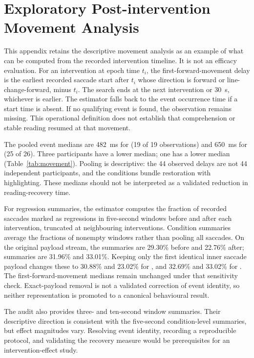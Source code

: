 \section{Exploratory Post-intervention Movement Analysis}
\label{sec:exploratory}

This appendix retains the descriptive movement analysis as an example of what can be computed from the recorded intervention timeline. It is not an efficacy evaluation. For an intervention at epoch time $t_i$, the first-forward-movement delay is the earliest recorded saccade start after $t_i$ whose direction is forward or line-change-forward, minus $t_i$. The search ends at the next intervention or 30~s, whichever is earlier. The estimator falls back to the event occurrence time if a start time is absent. If no qualifying event is found, the observation remains missing. This operational definition does not establish that comprehension or stable reading resumed at that movement.

\par\addvspace{\medskipamount}
\noindent\begin{minipage}{\columnwidth}
\captionsetup{hypcap=false}
\label{tab:movement}
\centering

\end{minipage}
\par\addvspace{\medskipamount}

The pooled event medians are 482~ms for \on{} (19 of 19 observations) and 650~ms for \off{} (25 of 26). Three participants have a lower \on{} median; one has a lower \off{} median (Table~\ref{tab:movement}). Pooling is descriptive: the 44 observed delays are not 44 independent participants, and the conditions bundle restoration with highlighting. These medians should not be interpreted as a validated reduction in reading-recovery time.

For regression summaries, the estimator computes the fraction of recorded saccades marked as regressions in five-second windows before and after each intervention, truncated at neighbouring interventions. Condition summaries average the fractions of nonempty windows rather than pooling all saccades. On the original payload stream, the \on{} summaries are 29.30\% before and 22.76\% after; \off{} summaries are 31.96\% and 33.01\%. Keeping only the first identical inner saccade payload changes these to 30.88\% and 23.02\% for \on{}, and 32.69\% and 33.02\% for \off{}. The first-forward-movement medians remain unchanged under that sensitivity check. Exact-payload removal is not a validated correction of event identity, so neither representation is promoted to a canonical behavioural result.

The audit also provides three- and ten-second window summaries. Their descriptive direction is consistent with the five-second condition-level summaries, but effect magnitudes vary. Resolving event identity, recording a reproducible protocol, and validating the recovery measure would be prerequisites for an intervention-effect study.
